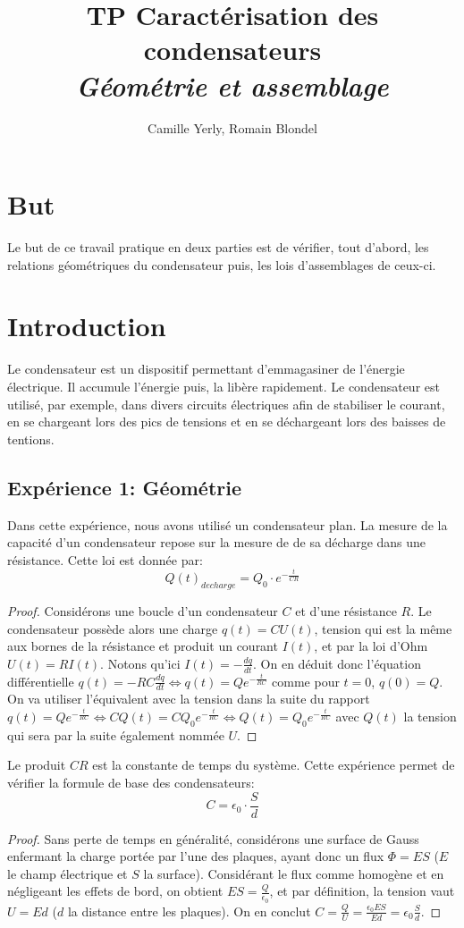 \documentclass[11pt]{article}
\title{\textbf{TP Caractérisation des condensateurs} \\ \textit{Géométrie et assemblage}}
\author{Camille Yerly, Romain Blondel}
\affil{2M8, Gymnase Auguste Piccard}
\begin{document}
\maketitle

\section{But}
Le but de ce travail pratique en deux parties est de vérifier, tout d'abord, les relations géométriques du condensateur puis, les lois d'assemblages de ceux-ci.
\section{Introduction}
Le condensateur est un dispositif permettant d'emmagasiner de l'énergie électrique. Il accumule l'énergie puis, la libère rapidement. Le condensateur est utilisé, par exemple, dans divers circuits électriques afin de stabiliser le courant, en se chargeant lors des pics de tensions et en se déchargeant lors des baisses de tentions.
\subsection{Expérience 1: Géométrie}
Dans cette expérience, nous avons utilisé un condensateur plan. La mesure de la capacité d'un condensateur repose sur la mesure de de sa décharge dans une résistance. Cette loi est donnée par: 
$$Q(t)_{decharge}=Q_0 \cdot e^{-\frac{t}{CR}}$$ 

\begin{proof}
Considérons une boucle d'un condensateur $C$ et d'une résistance $R$. Le condensateur possède alors une charge $q(t) = C U(t)$, tension qui est la même aux bornes de la résistance et produit un courant $I(t)$, et par la loi d'Ohm $U(t) = R I(t)$. Notons qu'ici $I(t) = - \frac{dq}{dt}$. On en déduit donc l'équation différentielle $q(t) = -RC \frac{dq}{dt} \Leftrightarrow q(t) = Q e^{-\frac{t}{RC}}$ comme pour $t=0$, $q(0) =Q$. On va utiliser l'équivalent avec la tension dans la suite du rapport $q(t) = Q e^{-\frac{t}{RC}} \Leftrightarrow C Q(t) = C Q_0 e^{-\frac{t}{RC}} \Leftrightarrow Q(t) = Q_0 e^{-\frac{t}{RC}} $ avec $Q(t)$ la tension qui sera par la suite également nommée $U$.
\end{proof}

Le produit $CR$ est la constante de temps du système. Cette expérience permet de vérifier la formule de base des condensateurs: 
$$C=\epsilon_0  \cdot \frac{S}{d}$$

\begin{proof}
Sans perte de temps en généralité, considérons une surface de Gauss enfermant la charge portée par l'une des plaques, ayant donc un flux $\Phi = ES$ ($E$ le champ électrique et $S$ la surface). Considérant le flux comme homogène et en négligeant les effets de bord, on obtient $ES = \frac{Q}{\epsilon_0}$, et par définition, la tension vaut $U = E d$ ($d$ la distance entre les plaques). On en conclut $C = \frac{Q}{U} = \frac{\epsilon_0 E S}{E d} = \epsilon_0 \frac{S}{d}$.
\end{proof}
\end{document}
